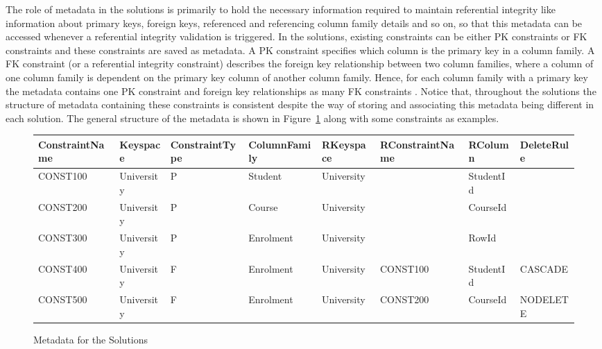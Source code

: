 The role of metadata in  the solutions is primarily to hold the necessary
 information required to maintain referential integrity like information about
 primary keys,  foreign keys,  referenced and referencing column family details
 and so on, so that this metadata can be accessed whenever a referential
 integrity validation is triggered.  
In the solutions,  existing constraints can be either \ac{PK} constraints
or \ac{FK} constraints and these constraints are saved as metadata.  A \ac{PK}
constraint specifies which column is the primary key in a column family.  A
\ac{FK} constraint (or a referential integrity constraint) describes the foreign
key relationship between two column families, where a column of one column
family is dependent on the primary key column of another column family.  Hence,
for each column family with a primary key  the
metadata  contains one \ac{PK} constraint  and foreign key relationships as
many
 \ac{FK}
constraints . Notice that, throughout the solutions 
 the structure of metadata containing these constraints is consistent despite
 the way of storing and associating this metadata being different
in each solution.  The general structure of the metadata is shown in
Figure~\ref{f:metadataInSolutions} along with some constraints as examples. \\

\begin{figure}[h]
	\centering
	
	\begin{tabular}{CCC CCC CC}
		\toprule
		\bfseries ConstraintName & \bfseries Keyspace & \bfseries ConstraintType &
		\bfseries ColumnFamily & \bfseries RKeyspace & \bfseries RConstraintName &
		\bfseries RColumn & \bfseries DeleteRule\\
		\midrule
		CONST100 & University & P & Student & University & & StudentId &\\
		\rc CONST200 & University & P & Course & University & & CourseId &\\
		CONST300 & University & P & Enrolment & University & & RowId &\\
		\rc CONST400 & University & F & Enrolment & University & CONST100 & StudentId
		& CASCADE\\
		CONST500 & University & F & Enrolment & University & CONST200 & CourseId &
		NODELETE\\
		\bottomrule
	\end{tabular}
	\caption{Metadata for the Solutions}\label{f:metadataInSolutions}
\end{figure}


